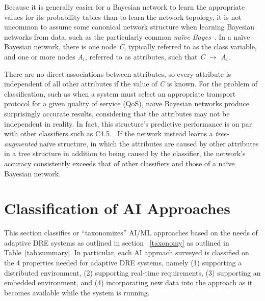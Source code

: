 \documentclass[conference]{IEEEtran}
\begin{document}

Because it is generally easier for a Bayesian network to  learn the appropriate values for its probability tables than  to learn the network topology, it is not uncommon to assume  some canonical network structure when learning Bayesian  networks from data, such as the particularly common \emph{na\"{i}ve Bayes}~\cite{Darwiche:10}.
In a na\"{i}ve Bayesian
network, there is one node \emph{C}, typically referred to as the class variable,
and one or
more nodes \emph{A$_{i}$}, referred to as attributes,
such that \emph{C} $\rightarrow$ \emph{A$_{i}$}.

There are no direct associations between attributes, so every attribute is independent of all other attributes if the value of \emph{C} is known. For the problem of classification, such as when a system must select an appropriate transport protocol for a given quality of service (QoS), na\"{i}ve Bayesian networks produce surprisingly accurate results, considering that the attributes may not be independent in reality. In fact, this structure's predictive performance is on par with other classifiers such as 
C4.5.~\cite{Friedman:97}\cite{Quinlan:93}
If the network instead learns a \emph{tree-augmented} na\"{i}ve structure, in which the attributes are caused by other attributes in a tree structure in addition to being caused by the classifier, the network's accuracy consistently exceeds that of other classifiers and those of a na\"{i}ve Bayesian network.


\section{Classification of AI Approaches}
\label{classification}
This section classifies or ``taxonomizes'' AI/ML approaches based on the needs of adaptive DRE systems as outlined in section ~\ref{taxonomy} as outlined in Table~\ref{tab:summary}. In particular, each AI approach surveyed is classified on the 4 properties needed for adaptive DRE systems, namely (1) supporting a distributed environment, (2) supporting real-time requirements, (3) supporting an embedded environment, and (4) incorporating new data into the approach as it becomes available while the system is running.
\end{document}
